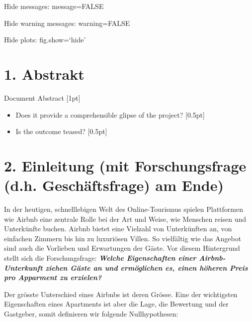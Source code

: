 \documentclass[
  journal,
]{IEEEtran}%
\begin{document}
Hide messages: message=FALSE

Hide warning messages: warning=FALSE

Hide plots: fig.show=`hide'

\hypertarget{abstrakt}{%
\section{1. Abstrakt}\label{abstrakt}}

Document Abstract {[}1pt{]}

\begin{itemize}
\item
  Does it provide a comprehensible glipse of the project? {[}0.5pt{]}
\item
  Is the outcome teased? {[}0.5pt{]}
\end{itemize}

\hypertarget{einleitung-mit-forschungsfrage-d.h.-geschuxe4ftsfrage-am-ende}{%
\section{2. Einleitung (mit Forschungsfrage (d.h. Geschäftsfrage) am
Ende)}\label{einleitung-mit-forschungsfrage-d.h.-geschuxe4ftsfrage-am-ende}}

In der heutigen, schnelllebigen Welt des Online-Tourismus spielen
Plattformen wie Airbnb eine zentrale Rolle bei der Art und Weise, wie
Menschen reisen und Unterkünfte buchen. Airbnb bietet eine Vielzahl von
Unterkünften an, von einfachen Zimmern bis hin zu luxuriösen Villen. So
vielfältig wie das Angebot sind auch die Vorlieben und Erwartungen der
Gäste. Vor diesem Hintergrund stellt sich die Forschungsfrage:
\textbf{\emph{Welche Eigenschaften einer Airbnb-Unterkunft ziehen Gäste
an und ermöglichen es, einen höheren Preis pro Apparment zu erzielen?}}

Der grösste Unterschied eines Airbnbs ist deren Grösse. Eine der
wichtigsten Eigenschaften eines Apartments ist aber die Lage, die
Bewertung und der Gastgeber, somit definieren wir folgende
Nullhypothesen:
\end{document}
